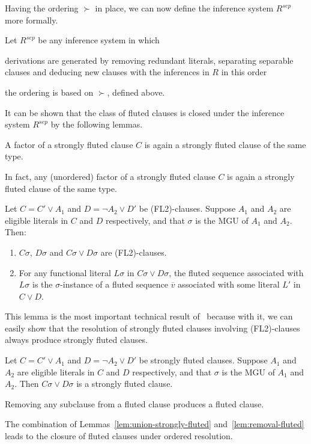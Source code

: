 Having the ordering \(\succ\) in place, we can now define the inference system \(R^{sep}\) more formally.

\begin{definition}
  Let \(R^{sep}\) be any inference system in which
  \begin{enumerate*}[label = (\roman*)]
    \item derivations are generated by removing redundant literals, separating separable clauses and deducing new clauses with the inferences in \(R\) in this order
    \item the ordering is based on \(\succ\), defined above.
  \end{enumerate*}
\end{definition}

It can be shown that the class of fluted clauses is closed under the inference system \(R^{sep}\) by the following lemmas.

\begin{lemma}\label{lem:factor-strongly-fluted}
  A factor of a strongly fluted clause \(C\) is again a strongly fluted clause of the same type.
\end{lemma}
In fact, any (unordered) factor of a strongly fluted clause \(C\) is again a strongly fluted clause of the same type.

\begin{lemma}
  Let \(C = C' \lor A_1\) and \(D = \neg A_2 \lor D'\) be (FL2)-clauses.
  Suppose \(A_1\) and \(A_2\) are eligible literals in \(C\) and \(D\) respectively, and that \(\sigma\) is the MGU of \(A_1\) and \(A_2\).
  Then:
  \begin{enumerate}
    \item \(C\sigma\), \(D\sigma\) and \(C\sigma \lor D\sigma\) are (FL2)-clauses.
    \item For any functional literal \(L\sigma\) in \(C\sigma \lor D\sigma\), the fluted sequence associated with \(L\sigma\) is the \(\sigma\)-instance of a fluted sequence \(\overline{v}\) associated with some literal \(L'\) in \(C \lor D\).
  \end{enumerate}
\end{lemma}

This lemma is the most important technical result of~\cite{hustadt2000resolution} because with it, we can easily show that the resolution of strongly fluted clauses involving (FL2)-clauses always produce strongly fluted clauses.
\begin{lemma}\label{lem:union-strongly-fluted}
  Let \(C = C' \lor A_1\) and \(D = \neg A_2 \lor D'\) be strongly fluted clauses. Suppose \(A_1\) and \(A_2\) are eligible literals in \(C\) and \(D\) respectively, and that \(\sigma\) is the MGU of \(A_1\) and \(A_2\).
  Then \(C\sigma \lor D\sigma\) is a strongly fluted clause.
\end{lemma}
\begin{lemma}\label{lem:removal-fluted}
  Removing any subclause from a fluted clause produces a fluted clause.
\end{lemma}
The combination of Lemmas~\ref{lem:union-strongly-fluted} and~\ref{lem:removal-fluted} leads to the closure of fluted clauses under ordered resolution.

